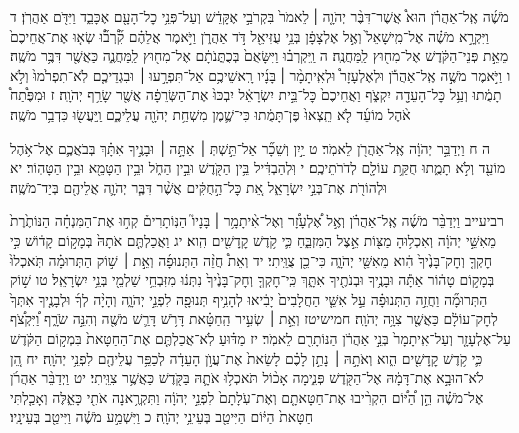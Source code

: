 \documentclass[twoside, openany, parskip=half, 11pt]{book}
\begin{document}
מֹשֶׁ֜ה אֶֽל־אַהֲרֹ֗ן הוּא֩ אֲשֶׁר־דִּבֶּ֨ר יְהֹוָ֤ה ׀ לֵאמֹר֙ בִּקְרֹבַ֣י אֶקָּדֵ֔שׁ וְעַל־פְּנֵ֥י כׇל־הָעָ֖ם אֶכָּבֵ֑ד וַיִּדֹּ֖ם אַהֲרֹֽן׃ ד וַיִּקְרָ֣א מֹשֶׁ֗ה אֶל־מִֽישָׁאֵל֙ וְאֶ֣ל אֶלְצָפָ֔ן בְּנֵ֥י עֻזִּיאֵ֖ל דֹּ֣ד אַהֲרֹ֑ן וַיֹּ֣אמֶר אֲלֵהֶ֗ם קִ֞‍֠רְב֞‍֠וּ שְׂא֤וּ אֶת־אֲחֵיכֶם֙ מֵאֵ֣ת פְּנֵי־הַקֹּ֔דֶשׁ אֶל־מִח֖וּץ לַֽמַּחֲנֶֽה׃ ה וַֽיִּקְרְב֗וּ וַיִּשָּׂאֻם֙ בְּכֻתֳּנֹתָ֔ם אֶל־מִח֖וּץ לַֽמַּחֲנֶ֑ה כַּאֲשֶׁ֖ר דִּבֶּ֥ר מֹשֶֽׁה׃ ו וַיֹּ֣אמֶר מֹשֶׁ֣ה אֶֽל־אַהֲרֹ֡ן וּלְאֶלְעָזָר֩ וּלְאִֽיתָמָ֨ר ׀ בָּנָ֜יו רָֽאשֵׁיכֶ֥ם אַל־תִּפְרָ֣עוּ ׀ וּבִגְדֵיכֶ֤ם לֹֽא־תִפְרֹ֙מוּ֙ וְלֹ֣א תָמֻ֔תוּ וְעַ֥ל כׇּל־הָעֵדָ֖ה יִקְצֹ֑ף וַאֲחֵיכֶם֙ כׇּל־בֵּ֣ית יִשְׂרָאֵ֔ל יִבְכּוּ֙ אֶת־הַשְּׂרֵפָ֔ה אֲשֶׁ֖ר שָׂרַ֥ף יְהֹוָֽה׃ ז וּמִפֶּ֩תַח֩ אֹ֨הֶל מוֹעֵ֜ד לֹ֤א תֵֽצְאוּ֙ פֶּן־תָּמֻ֔תוּ כִּי־שֶׁ֛מֶן מִשְׁחַ֥ת יְהֹוָ֖ה עֲלֵיכֶ֑ם וַֽיַּעֲשׂ֖וּ כִּדְבַ֥ר מֹשֶֽׁה׃

ה ח וַיְדַבֵּ֣ר יְהֹוָ֔ה אֶֽל־אַהֲרֹ֖ן לֵאמֹֽר׃ ט יַ֣יִן וְשֵׁכָ֞ר אַל־תֵּ֣שְׁתְּ ׀ אַתָּ֣ה ׀ וּבָנֶ֣יךָ אִתָּ֗ךְ בְּבֹאֲכֶ֛ם אֶל־אֹ֥הֶל מוֹעֵ֖ד וְלֹ֣א תָמֻ֑תוּ חֻקַּ֥ת עוֹלָ֖ם לְדֹרֹתֵיכֶֽם׃ י וּֽלְהַבְדִּ֔יל בֵּ֥ין הַקֹּ֖דֶשׁ וּבֵ֣ין הַחֹ֑ל וּבֵ֥ין הַטָּמֵ֖א וּבֵ֥ין הַטָּהֽוֹר׃ יא וּלְהוֹרֹ֖ת אֶת־בְּנֵ֣י יִשְׂרָאֵ֑ל אֵ֚ת כׇּל־הַ֣חֻקִּ֔ים אֲשֶׁ֨ר דִּבֶּ֧ר יְהֹוָ֛ה אֲלֵיהֶ֖ם בְּיַד־מֹשֶֽׁה׃

רביעייב וַיְדַבֵּ֨ר מֹשֶׁ֜ה אֶֽל־אַהֲרֹ֗ן וְאֶ֣ל אֶ֠לְעָזָ֠ר וְאֶל־אִ֨יתָמָ֥ר ׀ בָּנָיו֮ הַנּֽוֹתָרִים֒ קְח֣וּ אֶת־הַמִּנְחָ֗ה הַנּוֹתֶ֙רֶת֙ מֵאִשֵּׁ֣י יְהֹוָ֔ה וְאִכְל֥וּהָ מַצּ֖וֹת אֵ֣צֶל הַמִּזְבֵּ֑חַ כִּ֛י קֹ֥דֶשׁ קׇֽדָשִׁ֖ים הִֽוא׃ יג וַאֲכַלְתֶּ֤ם אֹתָהּ֙ בְּמָק֣וֹם קָד֔וֹשׁ כִּ֣י חׇקְךָ֤ וְחׇק־בָּנֶ֙יךָ֙ הִ֔וא מֵאִשֵּׁ֖י יְהֹוָ֑ה כִּי־כֵ֖ן צֻוֵּֽיתִי׃ יד וְאֵת֩ חֲזֵ֨ה הַתְּנוּפָ֜ה וְאֵ֣ת ׀ שׁ֣וֹק הַתְּרוּמָ֗ה תֹּֽאכְלוּ֙ בְּמָק֣וֹם טָה֔וֹר אַתָּ֕ה וּבָנֶ֥יךָ וּבְנֹתֶ֖יךָ אִתָּ֑ךְ כִּֽי־חׇקְךָ֤ וְחׇק־בָּנֶ֙יךָ֙ נִתְּנ֔וּ מִזִּבְחֵ֥י שַׁלְמֵ֖י בְּנֵ֥י יִשְׂרָאֵֽל׃ טו שׁ֣וֹק הַתְּרוּמָ֞ה וַחֲזֵ֣ה הַתְּנוּפָ֗ה עַ֣ל אִשֵּׁ֤י הַחֲלָבִים֙ יָבִ֔יאוּ לְהָנִ֥יף תְּנוּפָ֖ה לִפְנֵ֣י יְהֹוָ֑ה וְהָיָ֨ה לְךָ֜ וּלְבָנֶ֤יךָ אִתְּךָ֙ לְחׇק־עוֹלָ֔ם כַּאֲשֶׁ֖ר צִוָּ֥ה יְהֹוָֽה׃ חמישיטז וְאֵ֣ת ׀ שְׂעִ֣יר הַֽחַטָּ֗את דָּרֹ֥שׁ דָּרַ֛שׁ מֹשֶׁ֖ה וְהִנֵּ֣ה שֹׂרָ֑ף וַ֠יִּקְצֹ֠ף עַל־אֶלְעָזָ֤ר וְעַל־אִֽיתָמָר֙ בְּנֵ֣י אַהֲרֹ֔ן הַנּוֹתָרִ֖ם לֵאמֹֽר׃ יז מַדּ֗וּעַ לֹֽא־אֲכַלְתֶּ֤ם אֶת־הַחַטָּאת֙ בִּמְק֣וֹם הַקֹּ֔דֶשׁ כִּ֛י קֹ֥דֶשׁ קׇֽדָשִׁ֖ים הִ֑וא וְאֹתָ֣הּ ׀ נָתַ֣ן לָכֶ֗ם לָשֵׂאת֙ אֶת־עֲוֺ֣ן הָעֵדָ֔ה לְכַפֵּ֥ר עֲלֵיהֶ֖ם לִפְנֵ֥י יְהֹוָֽה׃ יח הֵ֚ן לֹא־הוּבָ֣א אֶת־דָּמָ֔הּ אֶל־הַקֹּ֖דֶשׁ פְּנִ֑ימָה אָכ֨וֹל תֹּאכְל֥וּ אֹתָ֛הּ בַּקֹּ֖דֶשׁ כַּאֲשֶׁ֥ר צִוֵּֽיתִי׃ יט וַיְדַבֵּ֨ר אַהֲרֹ֜ן אֶל־מֹשֶׁ֗ה הֵ֣ן הַ֠יּ֠וֹם הִקְרִ֨יבוּ אֶת־חַטָּאתָ֤ם וְאֶת־עֹֽלָתָם֙ לִפְנֵ֣י יְהֹוָ֔ה וַתִּקְרֶ֥אנָה אֹתִ֖י כָּאֵ֑לֶּה וְאָכַ֤לְתִּי חַטָּאת֙ הַיּ֔וֹם הַיִּיטַ֖ב בְּעֵינֵ֥י יְהֹוָֽה׃ כ וַיִּשְׁמַ֣ע מֹשֶׁ֔ה וַיִּיטַ֖ב בְּעֵינָֽיו׃
\end{document}
